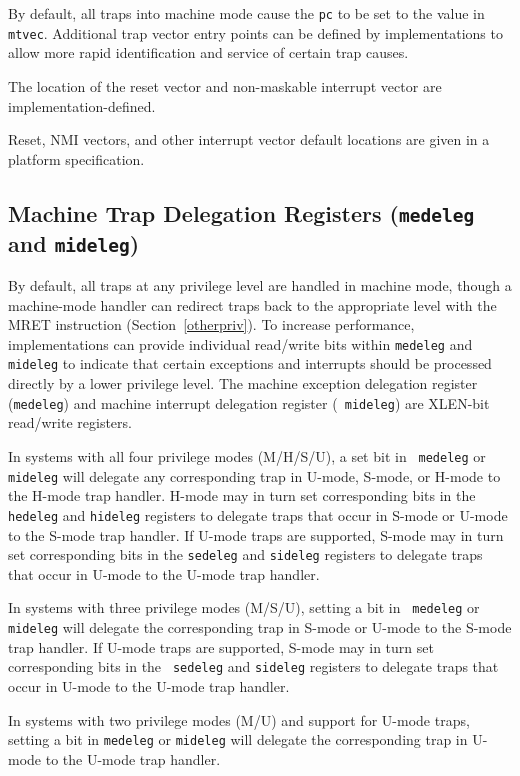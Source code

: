 By default, all traps into machine mode cause the {\tt pc} to be set to the
value in {\tt mtvec}.  Additional trap vector entry points can be defined by
implementations to allow more rapid identification and service of certain trap
causes.

The location of the reset vector and non-maskable interrupt vector are
implementation-defined.

\begin{commentary}
Reset, NMI vectors, and other interrupt vector default locations are
given in a platform specification.
\end{commentary}

\subsection{Machine Trap Delegation Registers ({\tt medeleg} and {\tt mideleg})}

By default, all traps at any privilege level are handled in machine
mode, though a machine-mode handler can redirect traps back to the
appropriate level with the MRET instruction (Section~\ref{otherpriv}).
To increase performance, implementations can provide individual
read/write bits within {\tt medeleg} and {\tt mideleg} to indicate
that certain exceptions and interrupts should be processed directly by
a lower privilege level.  The machine exception delegation register
({\tt medeleg}) and machine interrupt delegation register ({\tt
  mideleg}) are XLEN-bit read/write registers.

In systems with all four privilege modes (M/H/S/U), a set bit in {\tt
  medeleg} or {\tt mideleg} will delegate any corresponding trap in
U-mode, S-mode, or H-mode to the H-mode trap handler.  H-mode may in
turn set corresponding bits in the {\tt hedeleg} and {\tt hideleg}
registers to delegate traps that occur in S-mode or U-mode to the
S-mode trap handler.  If U-mode traps are supported, S-mode may in
turn set corresponding bits in the {\tt sedeleg} and {\tt sideleg}
registers to delegate traps that occur in U-mode to the U-mode trap
handler.

In systems with three privilege modes (M/S/U), setting a bit in {\tt
  medeleg} or {\tt mideleg} will delegate the corresponding trap in
S-mode or U-mode to the S-mode trap handler. If U-mode traps are
supported, S-mode may in turn set corresponding bits in the {\tt
  sedeleg} and {\tt sideleg} registers to delegate traps that occur in
U-mode to the U-mode trap handler.

In systems with two privilege modes (M/U) and support for U-mode
traps, setting a bit in {\tt medeleg} or {\tt mideleg} will
delegate the corresponding trap in U-mode to the U-mode trap handler.

